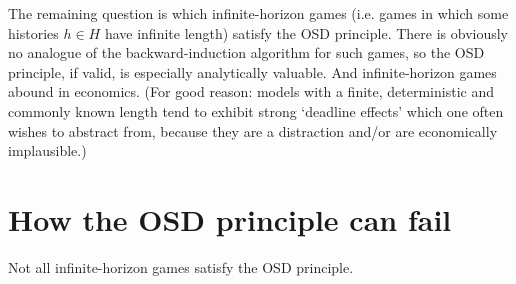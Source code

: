 The remaining question is which infinite-horizon games (i.e. games in which some histories $h \in H$ have infinite length) satisfy the OSD principle.
There is obviously no analogue of the backward-induction algorithm for such games, so the OSD principle, if valid, is especially analytically valuable. And infinite-horizon games abound in economics. (For good reason: models with a finite, deterministic and commonly known length tend to exhibit strong `deadline effects' which one often wishes to abstract from, because they are a distraction and/or are economically implausible.)



\section{How the OSD principle can fail}
\label{osdp:invalid}

Not all infinite-horizon games satisfy the OSD principle.

